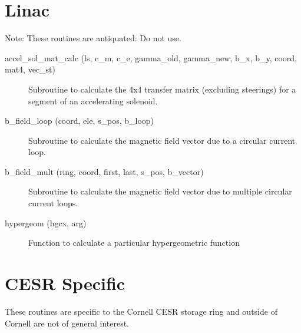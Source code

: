 \section{Linac}
\label{r:linac}    

Note: These routines are antiquated: Do not use.

\begin{description}

\item[accel\_sol\_mat\_calc (ls, c\_m, c\_e, gamma\_old, gamma\_new, 
b\_x, b\_y, coord, mat4, vec\_st)] \Newline
Subroutine to calculate the 4x4 transfer matrix (excluding steerings) for a 
segment of an accelerating solenoid. 

\item[b\_field\_loop (coord, ele, s\_pos, b\_loop)] \Newline
Subroutine to calculate the magnetic field vector due to a 
circular current loop. 

\item[b\_field\_mult (ring, coord, first, last, s\_pos, b\_vector)] \Newline
Subroutine to calculate the magnetic field vector due to multiple 
circular current loops. 

\item[hypergeom (hgcx, arg)] \Newline
Function to calculate a particular hypergeometric function 

\end{description}

\section{CESR Specific}
\label{r:cesr}

These routines are specific to the Cornell CESR storage ring and
outside of Cornell are not of general interest.

